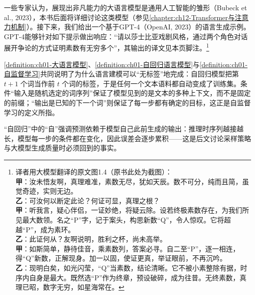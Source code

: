 \documentclass[../../main.tex]{subfiles}
\begin{document}
一些专家认为，展现出非凡能力的大语言模型是通用人工智能的雏形（Bubeck et al., 2023），本书后面将详细讨论这类模型（参见\cref{chapter:ch12-Transformer与注意力机制}）。接下来，我们给出一个基于GPT-4（OpenAI, 2023）的语言生成示例。GPT-4能够针对如下提示做出响应：“请以莎士比亚戏剧风格，通过两个角色对话展开争论的方式证明素数有无穷多个”，其输出的译文见本页脚注。\footnote{译者用大模型翻译的原文图1.4（原书此处为截图）：\\
\textbf{甲}：汝未悟友啊，真理难准，素数无尽，犹如天辰。数不可分，纯而且简，虽觉奇迹，实则无边。\\
\textbf{乙}：可汝何以断定此论？何证可显，真理之根？\\
\textbf{甲}：听我言，疑心伴侣，一证妙绝，将疑云除。设若终极素数存在，为我们所见最大数领。名之“P”字，记于案头，构思新数“Q”，令人惊叹。它将超越“P”，成为素环。\\
\textbf{乙}：此证何从？友啊说明，胜利之杯，尚未高举。\\
\textbf{甲}：如斯简单，静待佳音，乘素数列，答案必寻。自二至“P”，逐一相连，得“Q”新数，正解现身。加一以固，使证更真，举证眼前，不再沉吟。\\
\textbf{乙}：现明白矣，如光闪莹，“Q”当素数，结论清晰。它不被小素整除有据，时序内自身是最大。既然选“P”作为终章，预设破碎，成为往昔。无终素数，真理已昭，数字无穷，如星海常在。}

\begin{remark}
\cref{definition:ch01-大语言模型}、\cref{definition:ch01-自回归语言模型}与\cref{definition:ch01-自监督学习}共同说明了为什么语言建模可以“无标签”地完成：自回归模型把第 $t+1$ 个词当作前 $t$ 个词的标签，于是任何一个文本语料都自动变成了训练集。条件“输入是随机选定的词序列”保证了模型见到的是文本的多种上下文，而不是固定的前缀；“输出是已知的下一个词”则保证了每一步都有确定的目标，这正是自监督学习的定义所指。

“自回归”中的“自”强调预测依赖于模型自己此前生成的输出：推理时序列越接越长，模型每一步的条件都在变化，因此误差会逐步累积——这是后文讨论采样策略与大模型生成质量时必须回到的事实。
\end{remark}
\end{document}
